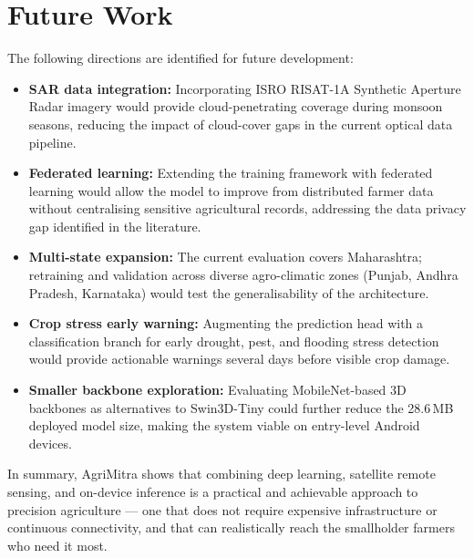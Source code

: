 \section{Future Work}

The following directions are identified for future development:

\begin{itemize}
    \item \textbf{SAR data integration:} Incorporating ISRO RISAT-1A Synthetic Aperture Radar imagery would provide cloud-penetrating coverage during monsoon seasons, reducing the impact of cloud-cover gaps in the current optical data pipeline.
    \item \textbf{Federated learning:} Extending the training framework with federated learning \cite{kumar2023federated} would allow the model to improve from distributed farmer data without centralising sensitive agricultural records, addressing the data privacy gap identified in the literature.
    \item \textbf{Multi-state expansion:} The current evaluation covers Maharashtra; retraining and validation across diverse agro-climatic zones (Punjab, Andhra Pradesh, Karnataka) would test the generalisability of the architecture.
    \item \textbf{Crop stress early warning:} Augmenting the prediction head with a classification branch for early drought, pest, and flooding stress detection would provide actionable warnings several days before visible crop damage.
    \item \textbf{Smaller backbone exploration:} Evaluating MobileNet-based 3D backbones as alternatives to Swin3D-Tiny could further reduce the 28.6\,MB deployed model size, making the system viable on entry-level Android devices.
\end{itemize}

In summary, AgriMitra shows that combining deep learning, satellite remote sensing, and on-device inference is a practical and achievable approach to precision agriculture --- one that does not require expensive infrastructure or continuous connectivity, and that can realistically reach the smallholder farmers who need it most.
